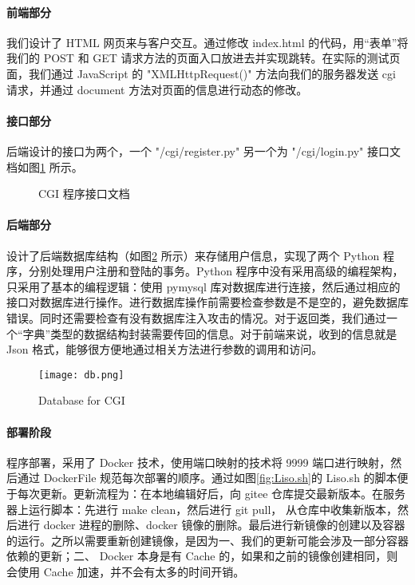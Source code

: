\paragraph*{前端部分} 我们设计了 HTML 网页来与客户交互。通过修改 index.html 的代码，用“表单”将我们的 POST 和 GET 请求方法的页面入口放进去并实现跳转。在实际的测试页面，我们通过 JavaScript 的 "XMLHttpRequest()" 方法向我们的服务器发送 cgi 请求，并通过 document 方法对页面的信息进行动态的修改。

\paragraph*{接口部分} 后端设计的接口为两个，一个 "/cgi/register.py" 另一个为 "/cgi/login.py" 接口文档如图\ref{fig:CGIPORT} 所示。

\begin{figure}[htbp!]
    \centering
    \caption{CGI 程序接口文档} \label{fig:CGIPORT}
\end{figure}


\paragraph*{后端部分} 设计了后端数据库结构（如图\ref{fig:database} 所示）来存储用户信息，实现了两个 Python 程序，分别处理用户注册和登陆的事务。Python 程序中没有采用高级的编程架构，只采用了基本的编程逻辑：使用 pymysql 库对数据库进行连接，然后通过相应的接口对数据库进行操作。进行数据库操作前需要检查参数是不是空的，避免数据库错误。同时还需要检查有没有数据库注入攻击的情况。对于返回类，我们通过一个“字典”类型的数据结构封装需要传回的信息。对于前端来说，收到的信息就是 Json 格式，能够很方便地通过相关方法进行参数的调用和访问。

\begin{figure}[htbp!]
    \centering
    \texttt{[image: db.png]}
    \caption{Database for CGI}\label{fig:database}
\end{figure}

\paragraph*{部署阶段} 程序部署，采用了 Docker 技术，使用端口映射的技术将 9999 端口进行映射，然后通过 DockerFile 规范每次部署的顺序。通过如图\ref{fig:Liso.sh}的 Liso.sh 的脚本便于每次更新。更新流程为：在本地编辑好后，向 gitee 仓库提交最新版本。在服务器上运行脚本：先进行 make clean，然后进行 git pull， 从仓库中收集新版本，然后进行 docker 进程的删除、docker 镜像的删除。最后进行新镜像的创建以及容器的运行。之所以需要重新创建镜像，是因为一、我们的更新可能会涉及一部分容器依赖的更新；二、 Docker 本身是有 Cache 的，如果和之前的镜像创建相同，则会使用 Cache 加速，并不会有太多的时间开销。

